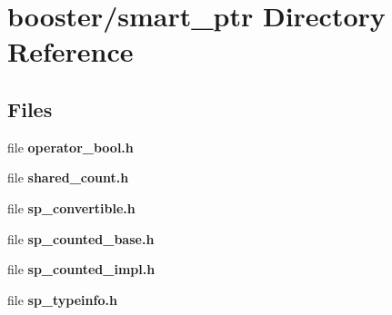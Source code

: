 \section{booster/smart\-\_\-ptr Directory Reference}
\label{dir_f1a171b40d31e7485c894ccadfa8f6f3}
\subsection*{Files}
\begin{DoxyCompactItemize}
\item 
file {\bfseries operator\-\_\-bool.\-h}
\item 
file {\bfseries shared\-\_\-count.\-h}
\item 
file {\bfseries sp\-\_\-convertible.\-h}
\item 
file {\bfseries sp\-\_\-counted\-\_\-base.\-h}
\item 
file {\bfseries sp\-\_\-counted\-\_\-impl.\-h}
\item 
file {\bfseries sp\-\_\-typeinfo.\-h}
\end{DoxyCompactItemize}
